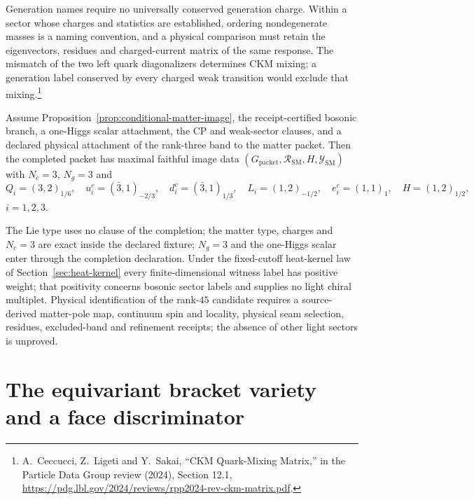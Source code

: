 \documentclass[11pt]{article}
\begin{document}
Generation names require no universally conserved generation charge. Within
a sector whose charges and statistics are established, ordering nondegenerate
masses is a naming convention, and a physical comparison must retain the
eigenvectors, residues and charged-current matrix of the same response. The
mismatch of the two left quark diagonalizers determines CKM mixing; a
generation label conserved by every charged weak transition would exclude
that mixing.\footnote{A.~Ceccucci, Z.~Ligeti and Y.~Sakai, ``CKM
Quark-Mixing Matrix,'' in the Particle Data Group review (2024), Section
12.1, \url{https://pdg.lbl.gov/2024/reviews/rpp2024-rev-ckm-matrix.pdf}.}

\begin{corollary}
\label{cor:declared-completion}
Assume Proposition~\ref{prop:conditional-matter-image}, the receipt-certified
bosonic branch, a one-Higgs scalar attachment, the CP and weak-sector clauses,
and a declared physical attachment of the rank-three band to the matter
packet. Then the completed packet has maximal faithful image data
\((G_{\mathrm{packet}},\mathcal R_{\mathrm{SM}},H,\mathcal Y_{\mathrm{SM}})\)
with \(N_c=3\), \(N_g=3\) and
\[
Q_i=(3,2)_{1/6},\quad
u_i^c=(\bar 3,1)_{-2/3},\quad
d_i^c=(\bar 3,1)_{1/3},\quad
L_i=(1,2)_{-1/2},\quad
e_i^c=(1,1)_1,\quad
H=(1,2)_{1/2},
\]
\(i=1,2,3\).
\end{corollary}

The Lie type uses no clause of the completion; the matter type, charges and
\(N_c=3\) are exact inside the declared fixture; \(N_g=3\) and the one-Higgs
scalar enter through the completion declaration. Under the fixed-cutoff
heat-kernel law of Section~\ref{sec:heat-kernel} every finite-dimensional
witness label has positive weight; that positivity concerns bosonic sector
labels and supplies no light chiral multiplet. Physical identification of the
rank-\(45\) candidate requires a source-derived matter-pole map, continuum
spin and locality, physical seam selection, residues, excluded-band and
refinement receipts; the absence of other light sectors is unproved.

\section{The equivariant bracket variety and a face discriminator}
\label{sec:brackets}
\end{document}
